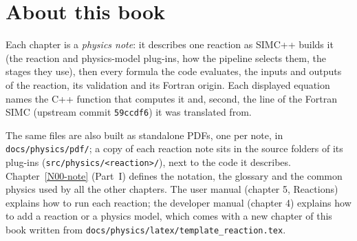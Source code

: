 \documentclass[book]{simcnote}
\begin{document}
\simcphysfrontmatter
\chapter*{About this book}
Each chapter is a \emph{physics note}: it describes one reaction as SIMC++ builds it (the reaction and physics-model
plug-ins, how the pipeline selects them, the stages they use), then every formula the code evaluates, the inputs and
outputs of the reaction, its validation and its Fortran origin. Each displayed equation names the C++ function that
computes it and, second, the line of the Fortran SIMC (upstream commit \texttt{59ccdf6}) it was translated from.

The same files are also built as standalone PDFs, one per note, in \texttt{docs/physics/pdf/}; a copy of each
reaction note sits in the source folders of its plug-ins (\texttt{src/physics/<reaction>/}), next to the code it
describes. Chapter~\ref{N00-note} (Part~I) defines the notation, the glossary and the common physics used by all the
other chapters. The user manual (chapter 5, Reactions) explains how to run each reaction; the developer manual
(chapter 4) explains how to add a reaction or a physics model, which comes with a new chapter of this book written
from \texttt{docs/physics/latex/template\_reaction.tex}.
\simcmainmatter
{}

\end{document}
